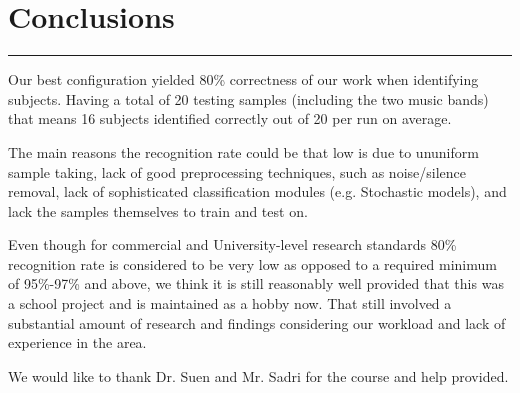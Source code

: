 \section{Conclusions}
\noindent
\rule{7.0in}{.013in}

Our best configuration yielded 80\% correctness
of our work when identifying subjects. Having a total
of 20 testing samples (including the two music bands) that means
16 subjects identified correctly out of 20 per run on average.

The main reasons the recognition rate could be that low
is due to ununiform sample taking, lack of good preprocessing
techniques, such as noise/silence removal, lack
of sophisticated classification modules (e.g. Stochastic models),
and lack the samples themselves to train and test on.

Even though for commercial and University-level research
standards 80\% recognition rate is considered to be very
low as opposed to a required minimum of 95\%-97\% and above,
we think it is still reasonably well provided that this was
a school project and is maintained as a hobby now.
That still involved a substantial
amount of research and findings considering our workload
and lack of experience in the area.

We would like to thank Dr. Suen and Mr. Sadri
for the course and help provided.
